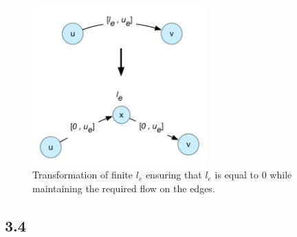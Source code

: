\documentclass[12pt]{article}
\begin{document}
\begin{figure}[h]
  \centering
    \includegraphics[width=0.6\textwidth]{figures/e3_3}
  \caption{Transformation of finite $l_e$ ensuring that $l_e$ is equal to 0 while maintaining the required flow on the edges.}
  \label{fig:e3_3}
\end{figure}

\subsection{3.4}
\end{document}
